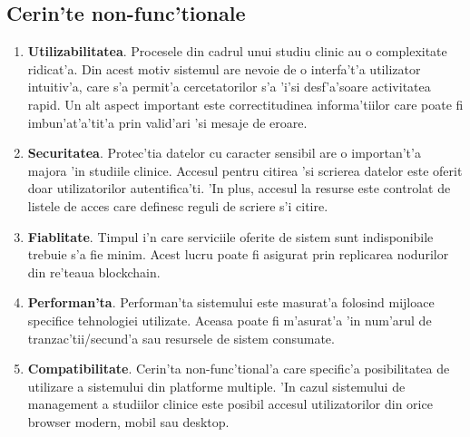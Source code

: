 \documentclass[12pt,a4paper,twoside]{report}
\begin{document}
\subsection{Cerin'te non-func'tionale}
\begin{enumerate}
\item \textbf{Utilizabilitatea}. Procesele din cadrul unui studiu clinic au o complexitate ridicat'a. Din acest motiv sistemul are nevoie de o interfa't'a utilizator intuitiv'a, care s'a permit'a cercetatorilor s'a 'i'si desf'a'soare activitatea rapid. Un alt aspect important este correctitudinea informa'tiilor care poate fi imbun'at'a'tit'a prin valid'ari 'si mesaje de eroare.
\item \textbf{Securitatea}. Protec'tia datelor cu caracter sensibil are o importan't'a majora 'in studiile clinice. Accesul pentru citirea 'si scrierea datelor este oferit doar utilizatorilor autentifica'ti. 'In plus, accesul la resurse este controlat de listele de acces care definesc reguli de scriere s'i citire.
\item \textbf{Fiablitate}. Timpul i'n care serviciile oferite de sistem sunt indisponibile trebuie s'a fie minim. Acest lucru poate fi asigurat prin replicarea nodurilor din re'teaua blockchain.
\item \textbf{Performan'ta}. Performan'ta sistemului este masurat'a folosind mijloace specifice tehnologiei utilizate. Aceasa poate fi m'asurat'a 'in num'arul de tranzac'tii/secund'a sau resursele de sistem consumate.
\item \textbf{Compatibilitate}. Cerin'ta non-func'tional'a care specific'a posibilitatea de utilizare a sistemului din platforme multiple. 'In cazul sistemului de management a studiilor clinice este posibil accesul utilizatorilor din orice browser modern, mobil sau desktop. 
\end{enumerate}
\end{document}

